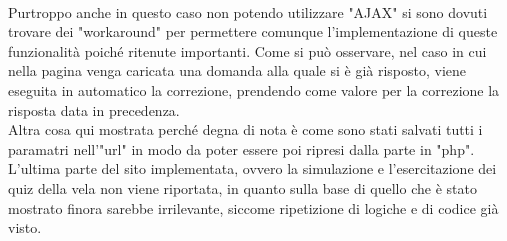 \leavevmode\\
Purtroppo anche in questo caso non potendo utilizzare "AJAX" si sono dovuti trovare dei "workaround" per permettere comunque l'implementazione di queste funzionalità poiché ritenute importanti. Come si può osservare, nel caso in cui nella pagina venga caricata una domanda alla quale si è già risposto, viene eseguita in automatico la correzione, prendendo come valore per la correzione la risposta data in precedenza.\\
Altra cosa qui mostrata perché degna di nota è come sono stati salvati tutti i paramatri nell'"url" in modo da poter essere poi ripresi dalla parte in "php".\\

L'ultima parte del sito implementata, ovvero la simulazione e l'esercitazione dei quiz della vela non viene riportata, in quanto sulla base di quello che è stato mostrato finora sarebbe irrilevante, siccome ripetizione di logiche e di codice già visto. 